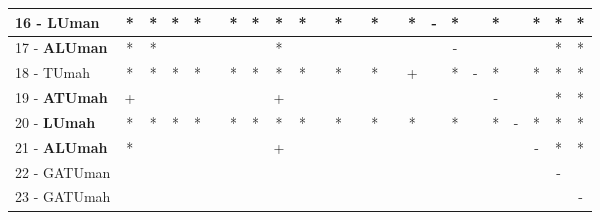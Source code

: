 \begin{table}[h]
\begin{center}
\begin{tabular}{lcc|cc|cc|cc|cc|cc|cc|cc|cc|cc|cc|c}
16 - \textbf{LUman}	& * & * & * & * &   & * & * & * & * &   & * &   & * &   & * & - & * &   & * &   & * & * & * \\ \hline
17 - \textbf{ALUman}	& * & * &   &   &   &   &   & * &   &   &   &   &   &   &   &   & - &   &   &   &   & * & * \\
18 - TUmah	& * & * & * & * &   & * & * & * & * &   & * &   & * &   & + &   & * & - & * &   & * & * & * \\ \hline
19 - \textbf{ATUmah}	& + &   &   &   &   &   &   & + &   &   &   &   &   &   &   &   &   &   & - &   &   & * & * \\
20 - \textbf{LUmah}	& * & * & * & * &   & * & * & * & * &   & * &   & * &   & * &   & * &   & * & - & * & * & * \\ \hline
21 - \textbf{ALUmah}	& * &   &   &   &   &   &   & + &   &   &   &   &   &   &   &   &   &   &   &   & - & * & * \\
22 - GATUman	&   &   &   &   &   &   &   &   &   &   &   &   &   &   &   &   &   &   &   &   &   & - &   \\ \hline
23 - GATUmah	&   &   &   &   &   &   &   &   &   &   &   &   &   &   &   &   &   &   &   &   &   &   & - \\\end{tabular}
\label{stratsALCKappaFriedIELM}
\end{center}
\end{table}